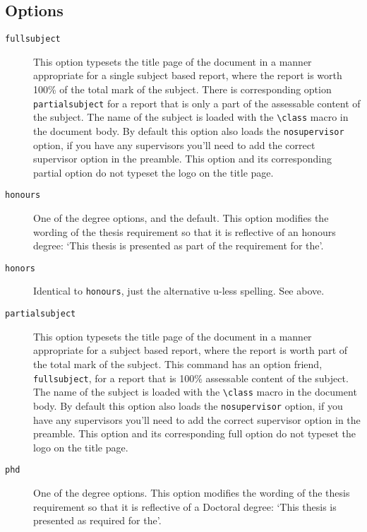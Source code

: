 \documentclass[12pt,oneside]{article}
\newcommand{\oporcom}[1]{\texttt{\color{Red}#1}} %
\begin{document}
\subsection*{Options}
\begin{description}
    \item[\oporcom{fullsubject}]
    This option typesets the title page of the document in a manner appropriate for a single subject based report, where the report is worth 100\% of the total mark of the subject. There is corresponding option \oporcom{partialsubject} for a report that is only a part of the assessable content of the subject. The name of the subject is loaded with the \oporcom{\textbackslash{}class} macro in the document body. By default this option also loads the \oporcom{nosupervisor} option, if you have any supervisors you'll need to add the correct supervisor option in the preamble. This option and its corresponding partial option do not typeset the logo on the title page.
    
    \item[\oporcom{honours}]
    One of the degree options, and the default. This option modifies the wording of the thesis requirement so that it is reflective of an honours degree: `This thesis is presented as part of the requirement for the'.
    
    \item[\oporcom{honors}]
    Identical to \oporcom{honours}, just the alternative u-less spelling. See above.
    
    \item[\oporcom{partialsubject}]
    This option typesets the title page of the document in a manner appropriate for a subject based report, where the report is worth part of the total mark of the subject. This  command has an option friend, \oporcom{fullsubject}, for a report that is 100\% assessable content of the subject. The name of the subject is loaded with the \oporcom{\textbackslash{}class} macro in the document body. By default this option also loads the \oporcom{nosupervisor} option, if you have any supervisors you'll need to add the correct supervisor option in the preamble. This option and its corresponding full option do not typeset the logo on the title page.
    
    \item[\oporcom{phd}]
    One of the degree options. This option modifies the wording of the thesis requirement so that it is reflective of a Doctoral degree: `This thesis is presented as required for the'.
    

\end{description}
\end{document}
